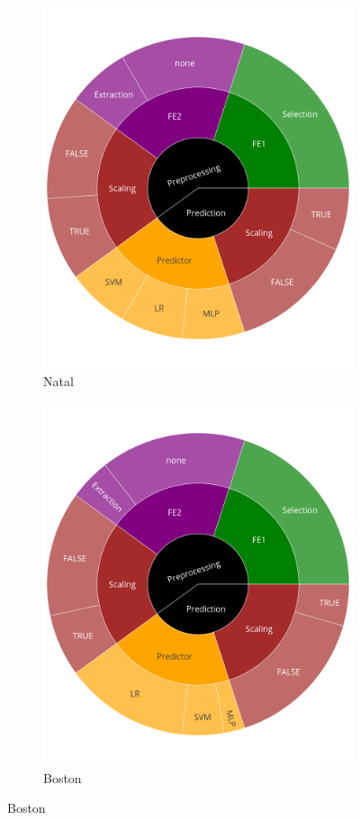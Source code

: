 \begin{figure}
  	\begin{subfigure}[t]{0.3\textwidth}
    \centering\includegraphics[width=\textwidth]{img/sunburst/natal.png}
    \caption{Natal}
  	\end{subfigure}
	\begin{subfigure}[t]{0.3\textwidth}
    \centering\includegraphics[width=\textwidth]{img/sunburst/boston.png}
    \caption{Boston}
  	\end{subfigure}


\end{figure}
